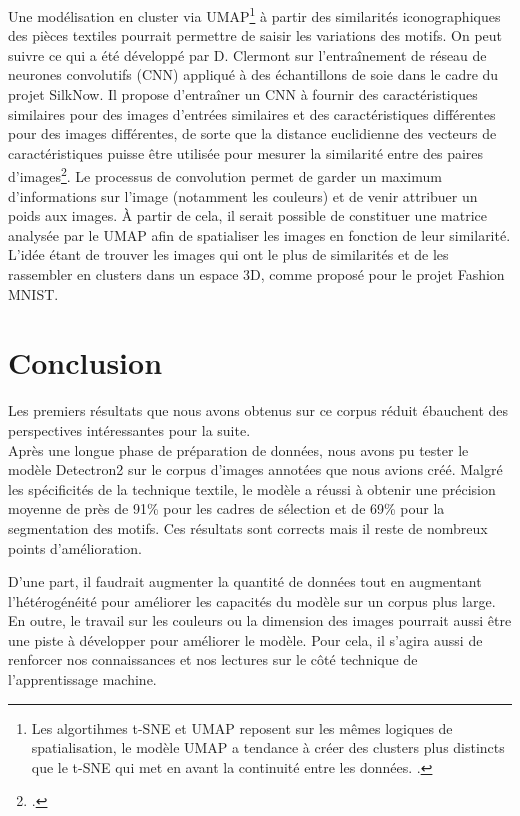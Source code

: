 \documentclass[a4paper, twoside, 12pt]{book}
\begin{document}
Une modélisation en cluster via UMAP\footnote{Les algortihmes t-SNE et UMAP reposent sur les mêmes logiques de spatialisation, le modèle UMAP a tendance à créer des clusters plus distincts que le t-SNE qui met en avant la continuité entre les données. \cite[p.~30]{mcinnesUMAPUniformManifold2018}.} à partir des similarités iconographiques des pièces textiles pourrait permettre de saisir les variations des motifs.  On peut suivre ce qui a été développé par D. Clermont sur l'entraînement de réseau de neurones convolutifs (CNN) appliqué à des échantillons de soie dans le cadre du projet SilkNow. Il propose \og d'entraîner un CNN à fournir des caractéristiques similaires pour des images d'entrées similaires et des caractéristiques différentes pour des images différentes, de sorte que la distance euclidienne des vecteurs de caractéristiques puisse être utilisée pour mesurer la similarité entre des paires d'images\fg \footcite[p.~642]{clermontAssessingSemanticSimilarity2020}. Le processus de convolution permet de garder un maximum d'informations sur l'image (notamment les couleurs) et de venir attribuer un poids aux images. À partir de cela, il serait possible de constituer une matrice analysée par le UMAP afin de spatialiser les images en fonction de leur similarité. L'idée étant de trouver les images qui ont le plus de similarités et de les rassembler en clusters dans un espace 3D, comme proposé pour le projet Fashion MNIST.

\chapter*{Conclusion}
\pagestyle{empty}

Les premiers résultats que nous avons obtenus sur ce corpus réduit ébauchent des perspectives intéressantes pour la suite.\\

Après une longue phase de préparation de données, nous avons pu tester le modèle Detectron2 sur le corpus d'images annotées que nous avions créé. Malgré les spécificités de la technique textile, le modèle a réussi à obtenir une précision moyenne de près de 91\% pour les cadres de sélection et de 69\% pour la segmentation des motifs. Ces résultats sont corrects mais il reste de nombreux points d'amélioration. 

D'une part, il faudrait augmenter la quantité de données tout en augmentant l'hétérogénéité pour améliorer les capacités du modèle sur un corpus plus large. En outre, le travail sur les couleurs ou la dimension des images pourrait aussi être une piste à développer pour améliorer le modèle. Pour cela, il s'agira aussi de renforcer nos connaissances et nos lectures sur le côté technique de l'apprentissage machine.
\end{document}

